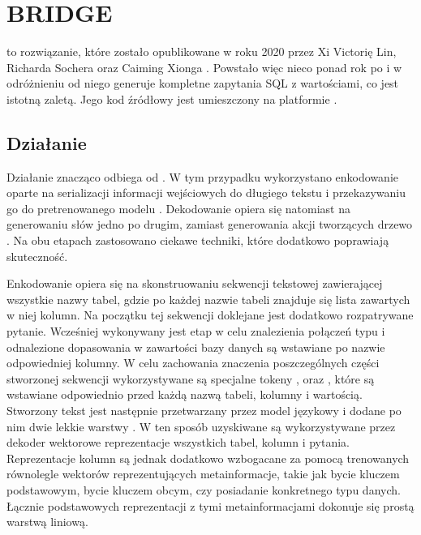 \section{BRIDGE}
 to rozwiązanie, które zostało opublikowane w roku 2020 przez Xi Victorię Lin, Richarda Sochera oraz Caiming Xionga . Powstało więc nieco ponad rok po  i w odróżnieniu od niego generuje kompletne zapytania SQL z wartościami, co jest istotną zaletą. Jego kod źródłowy jest umieszczony na platformie  .

\subsection{Działanie}
Działanie  znacząco odbiega od . W tym przypadku wykorzystano enkodowanie oparte na serializacji informacji wejściowych do długiego tekstu i przekazywaniu go do pretrenowanego modelu . Dekodowanie opiera się natomiast na generowaniu słów jedno po drugim, zamiast generowania akcji tworzących drzewo . Na obu etapach zastosowano ciekawe techniki, które dodatkowo poprawiają skuteczność.

Enkodowanie opiera się na skonstruowaniu sekwencji tekstowej zawierającej wszystkie nazwy tabel, gdzie po każdej nazwie tabeli znajduje się lista zawartych w niej kolumn. Na początku tej sekwencji doklejane jest dodatkowo rozpatrywane pytanie. Wcześniej wykonywany jest etap  w celu znalezienia połączeń typu  i odnalezione dopasowania w zawartości bazy danych są  wstawiane po nazwie odpowiedniej kolumny. W celu zachowania znaczenia poszczególnych części stworzonej sekwencji wykorzystywane są specjalne tokeny \code{[T]}, \code{[C]} oraz \code{[V]}, które są wstawiane odpowiednio przed każdą nazwą tabeli, kolumny i wartością. Stworzony tekst jest następnie przetwarzany przez model językowy  i dodane po nim dwie lekkie warstwy . W ten sposób uzyskiwane są wykorzystywane przez dekoder wektorowe reprezentacje wszystkich tabel, kolumn i pytania. Reprezentacje kolumn są jednak dodatkowo wzbogacane za pomocą trenowanych równolegle wektorów reprezentujących metainformacje, takie jak bycie kluczem podstawowym, bycie kluczem obcym, czy posiadanie konkretnego typu danych. Łącznie podstawowych reprezentacji z tymi metainformacjami dokonuje się prostą warstwą liniową.

